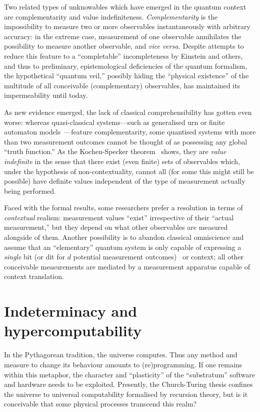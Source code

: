 \documentclass[12pt]{article}
\begin{document}
 Two related types of unknowables which have  emerged in the quantum context are
complementarity and value indefiniteness.
{\em Complementarity} is the impossibility to measure two or more observables instantaneously with arbitrary accuracy:
in the extreme case, measurement of one observable annihilates the possibility to measure another observable, and {\it vice versa.}
Despite attempts to reduce this feature to a ``completable'' incompleteness by Einstein and others,
and thus to preliminary, epistemological deficiencies of the quantum formalism,
the hypothetical ``quantum veil,''
possibly hiding the ``physical existence'' of the multitude of all conceivable (complementary) observables,
has maintained its impermeability until today.

As new evidence emerged,  the lack of classical comprehensibility  has gotten even worse:
whereas quasi-classical systems---such as generalised urn or finite automaton models~\cite{svozil-2008-ql}---feature complementarity, some
quantised systems with more than two measurement outcomes cannot be thought of as possessing any global ``truth function.''
As the Kochen-Specker theorem~\cite{specker-60,kochen1} shows,
they are {\em value indefinite} in the sense that there exist  (even finite) sets of observables which,
under the hypothesis of non-contextuality,
 cannot all (for some this might still be possible) have definite values
independent of the type of measurement
actually being performed.

Faced with the formal results, some researchers prefer a resolution in terms of {\em  contextual} realism:
measurement values ``exist'' irrespective of their ``actual measurement,''
but they depend on what other observables are measured alongside of them.
Another possibility is to abandon classical omniscience
and assume that an ``elementary'' quantum system is only capable
of expressing a {\em single} bit (or dit for $d$ potential measurement outcomes)~\cite{zeil-99}
or context; all other conceivable measurements are mediated by a measurement apparatus capable of
context translation.




\section{Indeterminacy and hypercomputability}

In the Pythagorean tradition, the universe computes.
Thus any method and measure to change its behaviour amounts to (re)programming.
If one remains within this metaphor, the character and ``plasticity'' of the ``substratum'' software and hardware needs to be exploited.
Presently, the Church-Turing thesis confines the universe to universal computability formalised by
recursion theory,
but is it conceivable that some physical processes transcend this realm?
\end{document}
